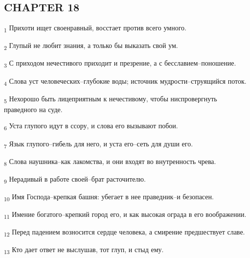 \subsection{CHAPTER 18}
\begin{tcolorbox}
\textsubscript{1} Прихоти ищет своенравный, восстает против всего умного.
\end{tcolorbox}
\begin{tcolorbox}
\textsubscript{2} Глупый не любит знания, а только бы выказать свой ум.
\end{tcolorbox}
\begin{tcolorbox}
\textsubscript{3} С приходом нечестивого приходит и презрение, а с бесславием--поношение.
\end{tcolorbox}
\begin{tcolorbox}
\textsubscript{4} Слова уст человеческих--глубокие воды; источник мудрости--струящийся поток.
\end{tcolorbox}
\begin{tcolorbox}
\textsubscript{5} Нехорошо быть лицеприятным к нечестивому, чтобы ниспровергнуть праведного на суде.
\end{tcolorbox}
\begin{tcolorbox}
\textsubscript{6} Уста глупого идут в ссору, и слова его вызывают побои.
\end{tcolorbox}
\begin{tcolorbox}
\textsubscript{7} Язык глупого--гибель для него, и уста его--сеть для души его.
\end{tcolorbox}
\begin{tcolorbox}
\textsubscript{8} Слова наушника--как лакомства, и они входят во внутренность чрева.
\end{tcolorbox}
\begin{tcolorbox}
\textsubscript{9} Нерадивый в работе своей--брат расточителю.
\end{tcolorbox}
\begin{tcolorbox}
\textsubscript{10} Имя Господа--крепкая башня: убегает в нее праведник--и безопасен.
\end{tcolorbox}
\begin{tcolorbox}
\textsubscript{11} Имение богатого--крепкий город его, и как высокая ограда в его воображении.
\end{tcolorbox}
\begin{tcolorbox}
\textsubscript{12} Перед падением возносится сердце человека, а смирение предшествует славе.
\end{tcolorbox}
\begin{tcolorbox}
\textsubscript{13} Кто дает ответ не выслушав, тот глуп, и стыд ему.
\end{tcolorbox}
